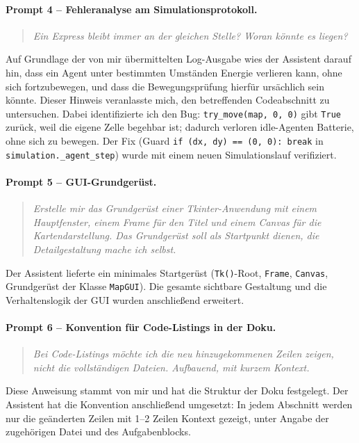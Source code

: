 \paragraph{Prompt 4 -- Fehleranalyse am Simulationsprotokoll.}
\begin{quote}
\textit{\glqq{}Ein Express bleibt immer an der gleichen Stelle? Woran könnte es liegen?\grqq{}}
\end{quote}
Auf Grundlage der von mir übermittelten Log-Ausgabe wies der Assistent darauf hin, dass ein Agent unter bestimmten Umständen Energie verlieren kann, ohne sich fortzubewegen, und dass die Bewegungsprüfung hierfür ursächlich sein könnte. Dieser Hinweis veranlasste mich, den betreffenden Codeabschnitt zu untersuchen. Dabei identifizierte ich den Bug: \texttt{try\_move(map, 0, 0)} gibt \texttt{True} zurück, weil die eigene Zelle begehbar ist; dadurch verloren idle-Agenten Batterie, ohne sich zu bewegen. Der Fix (Guard \texttt{if (dx, dy) == (0, 0): break} in \texttt{simulation.\_agent\_step}) wurde mit einem neuen Simulationslauf verifiziert.

\paragraph{Prompt 5 -- \acs{GUI}-Grundgerüst.}
\begin{quote}
\textit{\glqq{}Erstelle mir das Grundgerüst einer Tkinter-Anwendung mit einem Hauptfenster, einem Frame für den Titel und einem Canvas für die Kartendarstellung. Das Grundgerüst soll als Startpunkt dienen, die Detailgestaltung mache ich selbst.\grqq{}}
\end{quote}
Der Assistent lieferte ein minimales Startgerüst (\texttt{Tk()}-Root, \texttt{Frame}, \texttt{Canvas}, Grundgerüst der Klasse \texttt{MapGUI}). Die gesamte sichtbare Gestaltung und die Verhaltenslogik der \acs{GUI} wurden anschließend erweitert.

\paragraph{Prompt 6 -- Konvention für Code-Listings in der Doku.}
\begin{quote}
\textit{\glqq{}Bei Code-Listings möchte ich die neu hinzugekommenen Zeilen zeigen, nicht die vollständigen Dateien. Aufbauend, mit kurzem Kontext.\grqq{}}
\end{quote}
Diese Anweisung stammt von mir und hat die Struktur der Doku festgelegt. Der Assistent hat die Konvention anschließend umgesetzt: In jedem Abschnitt werden nur die geänderten Zeilen mit 1--2 Zeilen Kontext gezeigt, unter Angabe der zugehörigen Datei und des Aufgabenblocks.

